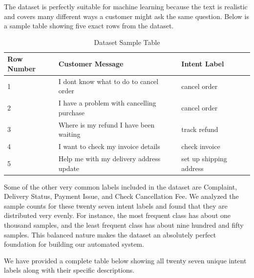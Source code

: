 \documentclass[12pt]{article}
\begin{document}
The dataset is perfectly suitable for machine learning because the text is realistic and covers many different ways a customer might ask the same question. Below is a sample table showing five exact rows from the dataset. 

\begin{table}[H]
\centering
\caption{Dataset Sample Table}
\begin{tabular}{|l|l|l|}
\hline
\textbf{Row Number} & \textbf{Customer Message} & \textbf{Intent Label} \\ \hline
1 & I dont know what to do to cancel order & cancel order \\ \hline
2 & I have a problem with cancelling purchase & cancel order \\ \hline
3 & Where is my refund I have been waiting & track refund \\ \hline
4 & I want to check my invoice details & check invoice \\ \hline
5 & Help me with my delivery address update & set up shipping address \\ \hline
\end{tabular}
\end{table}

Some of the other very common labels included in the dataset are Complaint, Delivery Status, Payment Issue, and Check Cancellation Fee. We analyzed the sample counts for these twenty seven intent labels and found that they are distributed very evenly. For instance, the most frequent class has about one thousand samples, and the least frequent class has about nine hundred and fifty samples. This balanced nature makes the dataset an absolutely perfect foundation for building our automated system.


We have provided a complete table below showing all twenty seven unique intent labels along with their specific descriptions.
\end{document}
